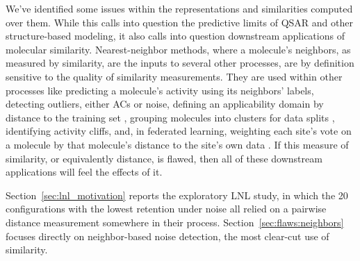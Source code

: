 We've identified some issues within the representations and similarities computed over them. While this calls into question the predictive limits of QSAR and other structure-based modeling, it also calls into question downstream applications of molecular similarity. Nearest-neighbor methods, where a molecule's neighbors, as measured by similarity, are the inputs to several other processes, are by definition sensitive to the quality of similarity measurements. They are used within other processes like predicting a molecule's activity using its neighbors' labels, detecting outliers, either ACs or noise, defining an applicability domain by distance to the training set \citep{Tropsha2010}, grouping molecules into clusters for data splits \citep{Butina1999}, identifying activity cliffs, and, in federated learning, weighting each site's vote on a molecule by that molecule's distance to the site's own data \citep{Hanser2025}. If this measure of similarity, or equivalently distance, is flawed, then all of these downstream applications will feel the effects of it.

Section~\ref{sec:lnl_motivation} reports the exploratory LNL study, in which the 20 configurations with the lowest retention under noise all relied on a pairwise distance measurement somewhere in their process. Section~\ref{sec:flaws:neighbors} focuses directly on neighbor-based noise detection, the most clear-cut use of similarity. 

